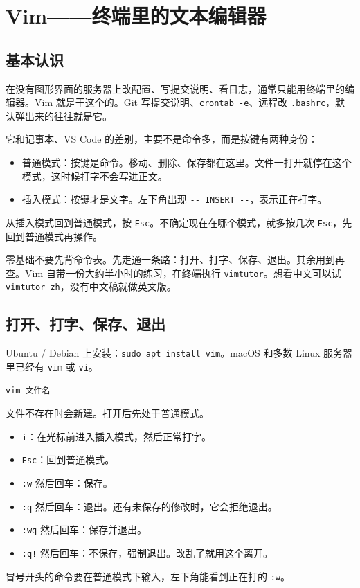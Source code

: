 \chapter{Vim——终端里的文本编辑器}
\section{基本认识}
在没有图形界面的服务器上改配置、写提交说明、看日志，通常只能用终端里的编辑器。Vim 就是干这个的。Git 写提交说明、\verb|crontab -e|、远程改 \verb|.bashrc|，默认弹出来的往往就是它。

它和记事本、VS Code 的差别，主要不是命令多，而是按键有两种身份：
\begin{itemize}
\item 普通模式：按键是命令。移动、删除、保存都在这里。文件一打开就停在这个模式，这时候打字不会写进正文。
\item 插入模式：按键才是文字。左下角出现 \verb|-- INSERT --|，表示正在打字。
\end{itemize}
从插入模式回到普通模式，按 \verb|Esc|。不确定现在在哪个模式，就多按几次 \verb|Esc|，先回到普通模式再操作。

零基础不要先背命令表。先走通一条路：打开、打字、保存、退出。其余用到再查。Vim 自带一份大约半小时的练习，在终端执行 \verb|vimtutor|。想看中文可以试 \verb|vimtutor zh|，没有中文稿就做英文版。

\section{打开、打字、保存、退出}
Ubuntu / Debian 上安装：\verb|sudo apt install vim|。macOS 和多数 Linux 服务器里已经有 \verb|vim| 或 \verb|vi|。

\begin{verbatim}
vim 文件名
\end{verbatim}
文件不存在时会新建。打开后先处于普通模式。

\begin{itemize}
\item \verb|i|：在光标前进入插入模式，然后正常打字。
\item \verb|Esc|：回到普通模式。
\item \verb|:w| 然后回车：保存。
\item \verb|:q| 然后回车：退出。还有未保存的修改时，它会拒绝退出。
\item \verb|:wq| 然后回车：保存并退出。
\item \verb|:q!| 然后回车：不保存，强制退出。改乱了就用这个离开。
\end{itemize}
冒号开头的命令要在普通模式下输入，左下角能看到正在打的 \verb|:w|。

